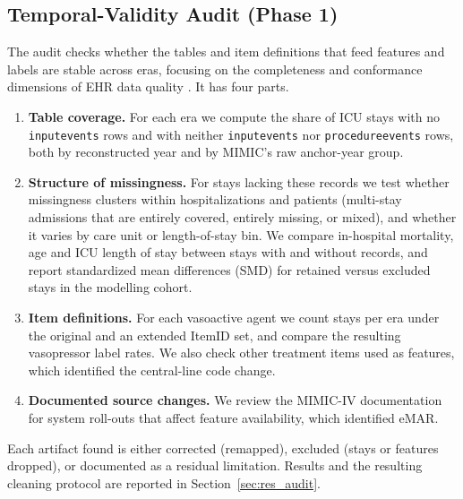\documentclass[10pt,a4paper,twocolumn]{article}
\begin{document}
	\subsection{Temporal-Validity Audit (Phase 1)}
	\label{sec:audit_method}
	The audit checks whether the tables and item definitions that feed features and labels are stable across eras, focusing on the completeness and conformance dimensions of EHR data quality \citep{weiskopf2013methods,kahn2016harmonized}. It has four parts.
	\begin{enumerate}\setlength{\itemsep}{1pt}
		\item \textbf{Table coverage.} For each era we compute the share of ICU stays with no \texttt{inputevents} rows and with neither \texttt{inputevents} nor \texttt{procedureevents} rows, both by reconstructed year and by MIMIC's raw anchor-year group.
		\item \textbf{Structure of missingness.} For stays lacking these records we test whether missingness clusters within hospitalizations and patients (multi-stay admissions that are entirely covered, entirely missing, or mixed), and whether it varies by care unit or length-of-stay bin. We compare in-hospital mortality, age and ICU length of stay between stays with and without records, and report standardized mean differences (SMD) for retained versus excluded stays in the modelling cohort.
		\item \textbf{Item definitions.} For each vasoactive agent we count stays per era under the original and an extended ItemID set, and compare the resulting vasopressor label rates. We also check other treatment items used as features, which identified the central-line code change.
		\item \textbf{Documented source changes.} We review the MIMIC-IV documentation for system roll-outs that affect feature availability, which identified eMAR.
	\end{enumerate}
	Each artifact found is either corrected (remapped), excluded (stays or features dropped), or documented as a residual limitation. Results and the resulting cleaning protocol are reported in Section~\ref{sec:res_audit}.
	
\end{document}
